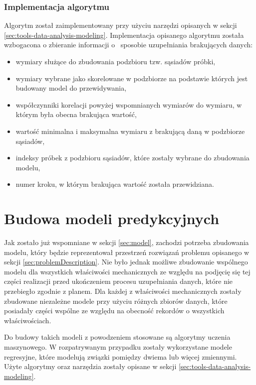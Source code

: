 \FloatBarrier

\subsubsection{Implementacja algorytmu}
Algorytm został zaimplementowany przy użyciu narzędzi opisanych w sekcji \ref{sec:tools-data-analysis-modeling}. Implementacja opisanego algorytmu została wzbogacona o zbieranie informacji o~ sposobie uzupełniania brakujących danych:
\begin{itemize}
    \item wymiary służące do zbudowania podzbioru tzw. sąsiadów próbki,
    \item wymiary wybrane jako skorelowane w podzbiorze na podstawie których jest budowany model do przewidywania,
    \item współczynniki korelacji powyżej wspomnianych wymiarów do wymiaru, w którym była obecna brakująca wartość,
    \item wartość minimalna i maksymalna wymiaru z brakującą daną  w podzbiorze sąsiadów,
    \item indeksy próbek z podzbioru sąsiadów, które zostały wybrane do zbudowania modelu,
    \item numer kroku, w którym brakująca wartość została przewidziana.
\end{itemize}

\section{Budowa modeli predykcyjnych}\label{sec:model-realization}
Jak zostało już wspomniane w sekcji \ref{sec:model}, zachodzi potrzeba zbudowania modelu, który będzie reprezentował przestrzeń rozwiązań problemu opisanego w sekcji \ref{sec:problemDescription}. Nie było jednak możliwe zbudowanie wspólnego modelu dla wszystkich właściwości mechanicznych ze względu na podjęcię się tej części realizacji przed ukończeniem procesu uzupełniania danych, które nie przebiegło zgodnie z planem. 
Dla każdej z właściwości mechanicznych zostały zbudowane niezależne modele przy użyciu różnych zbiorów danych, które posiadały części wspólne ze względu na obecność rekordów o wszystkich właściwościach.

Do budowy takich modeli z powodzeniem stosowane są algorytmy uczenia maszynowego. W rozpatrywanym przypadku zostały wykorzystane modele regresyjne, które modelują związki pomiędzy dwiema lub więcej zmiennymi. Użyte algorytmy oraz narzędzia zostały opisane w sekcji \ref{sec:tools-data-analysis-modeling}.


